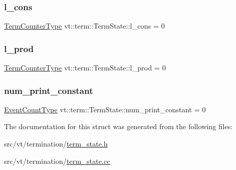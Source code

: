 \subsubsection{\texorpdfstring{l\+\_\+cons}{l\_cons}}
{\footnotesize\ttfamily \hyperlink{namespacevt_1_1term_a4fd378cdb0c36683afc1b3399d685f7f}{Term\+Counter\+Type} vt\+::term\+::\+Term\+State\+::l\+\_\+cons = 0}

\mbox{\label{structvt_1_1term_1_1_term_state_afec657b7e75164bdc75f464dd4dbe13b}} 
\subsubsection{\texorpdfstring{l\+\_\+prod}{l\_prod}}
{\footnotesize\ttfamily \hyperlink{namespacevt_1_1term_a4fd378cdb0c36683afc1b3399d685f7f}{Term\+Counter\+Type} vt\+::term\+::\+Term\+State\+::l\+\_\+prod = 0}

\mbox{\label{structvt_1_1term_1_1_term_state_ac3289ddbfa5c385c4d91d240bc17d67f}} 
\subsubsection{\texorpdfstring{num\+\_\+print\+\_\+constant}{num\_print\_constant}}
{\footnotesize\ttfamily \hyperlink{structvt_1_1term_1_1_term_state_a900fe4e9d98c81a320ae1dca27b71c2c}{Event\+Count\+Type} vt\+::term\+::\+Term\+State\+::num\+\_\+print\+\_\+constant = 0}



The documentation for this struct was generated from the following files\+:\begin{DoxyCompactItemize}
\item 
src/vt/termination/\hyperlink{term__state_8h}{term\+\_\+state.\+h}\item 
src/vt/termination/\hyperlink{term__state_8cc}{term\+\_\+state.\+cc}\end{DoxyCompactItemize}
